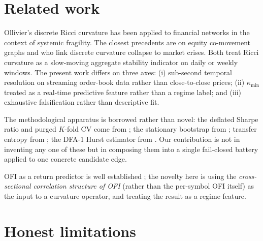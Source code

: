 \documentclass[11pt,a4paper]{article}
\begin{document}
\section{Related work}
\label{sec:related}

Ollivier's discrete Ricci curvature \citep{ollivier2009ricci} has been
applied to financial networks in the context of systemic fragility. The
closest precedents are \citet{sandhu2016marketfragility} on equity
co-movement graphs and \citet{bai2020networkricci} who link discrete
curvature collapse to market crises. Both treat Ricci curvature as a
slow-moving aggregate stability indicator on daily or weekly windows. The
present work differs on three axes: (i) sub-second temporal resolution on
streaming order-book data rather than close-to-close prices;
(ii) $\kappa_{\min}$ treated as a real-time predictive feature rather
than a regime label; and (iii) exhaustive falsification rather than
descriptive fit.

The methodological apparatus is borrowed rather than novel: the deflated
Sharpe ratio and purged $K$-fold CV come from
\citet{lopezdeprado2014deflated,lopezdeprado2018afml}; the stationary
bootstrap from \citet{politis1994stationary}; transfer entropy from
\citet{schreiber2000te}; the DFA-1 Hurst estimator from
\citet{peng1994dfa}. Our contribution is not in inventing any one of
these but in composing them into a single fail-closed battery applied
to one concrete candidate edge.

OFI as a return predictor is well established \citep{cont2014ofi}; the
novelty here is using the \emph{cross-sectional correlation structure of
OFI} (rather than the per-symbol OFI itself) as the input to a curvature
operator, and treating the result as a regime feature.

\section{Honest limitations}
\label{sec:limitations}
\end{document}

